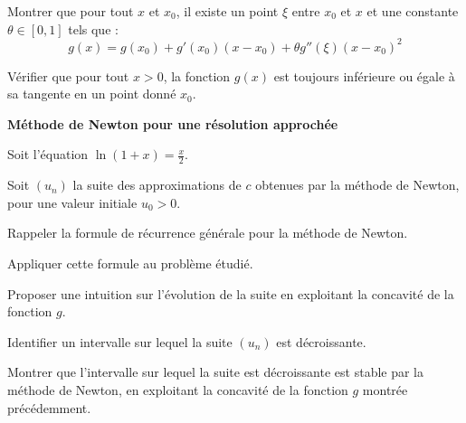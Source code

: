 \documentclass[10pt,a4paper]{article}
\begin{document}
\q Montrer que pour tout \( x \) et \( x_0 \), il existe un point \( \xi \) entre \( x_0 \) et \( x
\) et une constante \( \theta \in [0,1] \) tels que :
\[
g(x) = g(x_0) + g'(x_0)(x - x_0) + \theta g''(\xi) (x - x_0)^2
\]

\q Vérifier que pour tout \( x > 0 \), la fonction \( g(x) \) est toujours inférieure ou égale à sa
tangente en un point donné \( x_0 \).

\vspace{0.5cm}
\textbf{Méthode de Newton pour une résolution approchée}

Soit l'équation \( \ln(1+x) = \frac{x}{2} \).

Soit \( (u_n) \) la suite des approximations de \( c \) obtenues par la méthode de Newton, pour une
valeur initiale \( u_0 > 0 \).

\q Rappeler la formule de récurrence générale pour la méthode de Newton.

\q Appliquer cette formule au problème étudié.

\q Proposer une intuition sur l'évolution de la suite en exploitant la concavité de la fonction \( g
\).

\q Identifier un intervalle sur lequel la suite \( (u_n) \) est décroissante.

\q Montrer que l'intervalle sur lequel la suite est décroissante est stable par la méthode de
Newton, en exploitant la concavité de la fonction \( g \) montrée précédemment.
\end{document}
